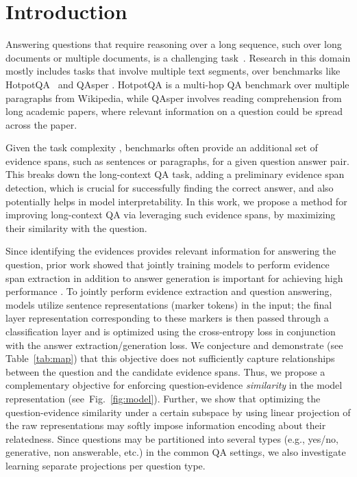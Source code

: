 \section{Introduction}
Answering questions that require reasoning over a long sequence, such over long documents or multiple documents, is a challenging task~\cite{quality2021}. 
Research in this domain mostly includes tasks that involve multiple text segments, over benchmarks like HotpotQA~\cite{yang-etal-2018-hotpotqa} and QAsper \cite{dasigi-etal-2021-dataset}. 
HotpotQA is a multi-hop QA benchmark over multiple paragraphs from Wikipedia, while QAsper involves reading comprehension from long academic papers, where relevant information on a question could be spread across the paper. 

Given the task complexity \cite{choi-etal-2017-coarse}, benchmarks often provide an additional set of evidence spans, such as sentences or paragraphs, for a given question answer pair. 
This breaks down the long-context QA task, adding a preliminary evidence span detection, which is crucial for successfully finding the correct answer, and also potentially helps in model interpretability. In this work, we propose a method for improving long-context QA via leveraging such evidence spans, by maximizing their similarity with the question.


Since identifying the evidences provides relevant information for answering the question, prior work showed that jointly training models to perform evidence span extraction in addition to answer generation is important for achieving high performance \cite{yang-etal-2018-hotpotqa,dasigi-etal-2021-dataset}. 
To jointly perform evidence extraction and question answering, models utilize sentence representations (marker tokens) in the input; the final layer representation corresponding to these markers is then passed through a classification layer and is optimized using the cross-entropy loss in conjunction with the answer extraction/generation loss. We conjecture and demonstrate (see Table~\ref{tab:map}) that this objective does not sufficiently capture relationships between the question and the candidate evidence spans. Thus, we propose a complementary objective for enforcing question-evidence \textit{similarity} in the model representation (see~Fig.~\ref{fig:model}). Further, we show that optimizing the question-evidence similarity under a certain subspace by using linear projection of the raw representations may softly impose information encoding about their relatedness. Since questions may be partitioned into several types (e.g., yes/no, generative, non answerable, etc.) in the common QA settings, we also investigate learning separate projections per question type.

